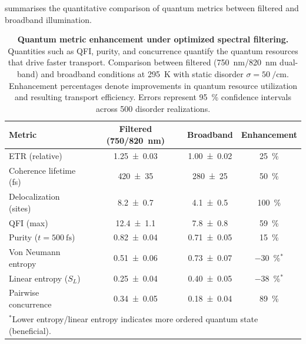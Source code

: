  summarises the quantitative comparison of quantum metrics between filtered and broadband illumination.

\begin{table}[ht]
\centering
\caption{\textbf{Quantum metric enhancement under optimized spectral filtering.} Quantities such as QFI, purity, and concurrence quantify the quantum resources that drive faster transport. Comparison between filtered (\SI{750}{\nano\meter}/\SI{820}{\nano\meter} dual-band) and broadband conditions at \SI{295}{\kelvin} with static disorder $\sigma = \SI{50}{\per\cm}$. Enhancement percentages denote improvements in quantum resource utilization and resulting transport efficiency. Errors represent \SI{95}{\percent} confidence intervals across 500 disorder realizations.}
\label{tab:quantum_metrics}
\begin{tabular}{lccc}
	\toprule
	\textbf{Metric}                        & \textbf{Filtered (\SI{750}{}/\SI{820}{\nano\meter})} & \textbf{Broadband}  &  \textbf{Enhancement}  \\ \midrule
	ETR (relative)                         &      \num{1.25 \pm 0.03}       & \num{1.00 \pm 0.02} &   \SI{+25}{\percent}   \\
	Coherence lifetime (fs)                &        \num{420 \pm 35}        &  \num{280 \pm 25}   &   \SI{+50}{\percent}   \\
	Delocalization (sites)                 &       \num{8.2 \pm 0.7}        &  \num{4.1 \pm 0.5}  &  \SI{+100}{\percent}   \\
	QFI (max)                              &       \num{12.4 \pm 1.1}       &  \num{7.8 \pm 0.8}  &   \SI{+59}{\percent}   \\
	Purity ($t = \SI{500}{\femto\second}$) &      \num{0.82 \pm 0.04}       & \num{0.71 \pm 0.05} &   \SI{+15}{\percent}   \\
	Von Neumann entropy                    &      \num{0.51 \pm 0.06}       & \num{0.73 \pm 0.07} & \SI{-30}{\percent}$^*$ \\
	Linear entropy ($S_L$)                 &      \num{0.25 \pm 0.04}       & \num{0.40 \pm 0.05} & \SI{-38}{\percent}$^*$ \\
	Pairwise concurrence                   &      \num{0.34 \pm 0.05}       & \num{0.18 \pm 0.04} &   \SI{+89}{\percent}   \\ \bottomrule
	\multicolumn{4}{l}{\scriptsize $^*$Lower entropy/linear entropy indicates more ordered quantum state (beneficial).}
\end{tabular}
\end{table}

